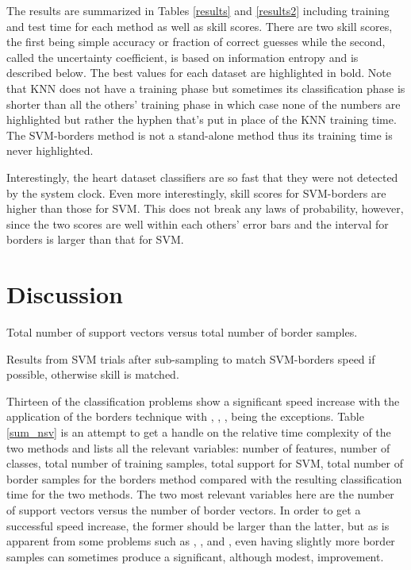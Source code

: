 The results are summarized in Tables \ref{results} and \ref{results2} including training
and test time for each method as well as skill scores. There are two skill scores,
the first being simple accuracy or fraction of correct guesses while the second,
called the uncertainty coefficient, is based on information entropy and is described
below.
The best values for each dataset are highlighted in bold.
Note that KNN does not have a training phase but sometimes its classification phase
is shorter than all the others' training phase in which case none of the numbers
are highlighted but rather the hyphen that's put in place of the KNN training
time.
The SVM-borders method is not a stand-alone method thus its training time is never
highlighted.

Interestingly, the heart dataset classifiers are so fast that they were not detected
by the system clock. Even more interestingly, skill scores for SVM-borders 
are higher than those for SVM. This does not break any
laws of probability, however, since the two scores are well within each others' error
bars and the interval for borders is larger than that for SVM.


\section{Discussion}

\label{discussion}

\begin{table}
	\caption{Total number of support vectors versus total number of border samples.}
	
	\label{sum_nsv}
\end{table}

\begin{table}
  \caption{Results from SVM trials after sub-sampling to match SVM-borders
	  speed if possible, otherwise skill is matched.}
  \label{subsampling_table}
  {\small
    
  }
\end{table}

Thirteen of the classification problems show a significant speed increase with the application
of the borders technique with , , ,  being the exceptions.
Table \ref{sum_nsv} is an attempt to get a handle on the relative time complexity 
of the two methods and lists all the relevant variables: number of features,
number of classes, total number of training samples, total support for SVM,
total number of border samples for the borders method compared with the resulting
classification time for the two methods. The two most relevant variables here are the
number of support vectors versus the number of border vectors.
In order to get a successful speed increase, the former should be larger than 
the latter, but as is apparent from some problems such as , , and ,
even having slightly more border samples can sometimes produce a significant,
although modest, improvement.

